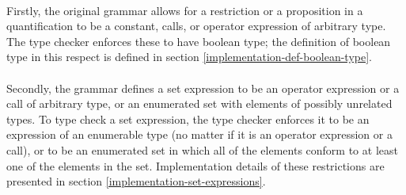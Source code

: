 \paragraph{} Firstly, the original grammar allows for a restriction or a proposition in a quantification to be a constant, calls, or operator expression of arbitrary type. The type checker enforces these to have boolean type; the definition of boolean type in this respect is defined in section \ref{implementation-def-boolean-type}.
\paragraph{} Secondly,  the grammar defines a set expression to be an operator expression or a call of arbitrary type, or an enumerated set with elements of possibly unrelated types. To type check a set expression, the type checker enforces it to be an expression of an enumerable type (no matter if it is an operator expression or a call), or to be an enumerated set in which all of the elements conform to at least one of the elements in the set. Implementation details of these restrictions are presented in section \ref{implementation-set-expressions}.



